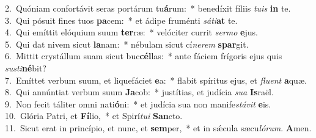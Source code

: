 {2.~}Quóniam confortávit seras portárum tu\textbf{á}rum:~* benedíxit fíliis \textit{tu}\textit{is} \textbf{in} te.\\
{3.~}Qui pósuit fines tuos \textbf{pa}cem:~* et ádipe fruménti \textit{sá}\textit{ti}\textbf{at} te.\\
{4.~}Qui emíttit elóquium suum \textbf{ter}ræ:~* velóciter currit \textit{ser}\textit{mo} \textbf{e}jus.\\
{5.~}Qui dat nivem sicut \textbf{la}nam:~* nébulam sicut cí\textit{ne}\textit{rem} \textbf{spar}git.\\
{6.~}Mittit crystállum suam sicut buc\textbf{cél}las:~* ante fáciem frígoris ejus quis \textit{su}\textit{sti}\textbf{né}bit?\\
{7.~}Emíttet verbum suum, et liquefáciet \textbf{e}a:~* flabit spíritus ejus, et \textit{flu}\textit{ent} \textbf{a}quæ.\\
{8.~}Qui annúntiat verbum suum \textbf{Ja}cob:~* justítias, et judícia \textit{su}\textit{a} \textbf{Is}raël.\\
{9.~}Non fecit táliter omni nati\textbf{ó}ni:~* et judícia sua non manife\textit{stá}\textit{vit} \textbf{e}is.\\
{10.~}Glória Patri, et \textbf{Fí}lio,~* et Spirí\textit{tu}\textit{i} \textbf{San}cto.\\
{11.~}Sicut erat in princípio, et nunc, et \textbf{sem}per,~* et in sǽcula sæcu\textit{ló}\textit{rum}. \textbf{A}men.\\
